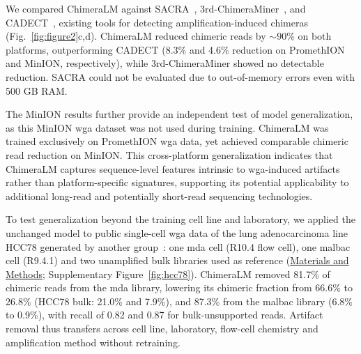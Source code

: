 \documentclass[pdflatex,lineno]{sn-jnl}%
\newif\ifrevisedtext
\newcommand{\chg}[1]{\ifrevisedtext\textcolor{revcolor}{#1}\else#1\fi}
\begin{document}
We compared ChimeraLM against SACRA~\cite{kiguchi2021longread}, 3rd-ChimeraMiner~\cite{lu2023exploration}, and CADECT~\cite{agyabeng2025evaluating}, existing tools for detecting amplification-induced chimeras (Fig.~\ref{fig:figure2}c,d).
ChimeraLM reduced chimeric reads by ${\sim}90$\% on both platforms, outperforming CADECT (8.3\% and 4.6\% reduction on PromethION and MinION, respectively), while 3rd-ChimeraMiner showed no detectable reduction.
SACRA could not be evaluated due to out-of-memory errors even with 500 GB RAM.

The MinION results further provide an independent test of model generalization, as this MinION \gls{wga} dataset was not used during training.
ChimeraLM was trained exclusively on PromethION \gls{wga} data, yet achieved comparable chimeric read reduction on MinION.
This cross-platform generalization indicates that ChimeraLM captures sequence-level features intrinsic to \gls{wga}-induced artifacts rather than platform-specific signatures, supporting its potential applicability to additional long-read and potentially short-read sequencing technologies.

\chg{To test generalization beyond the training cell line and laboratory, we applied the unchanged model to public single-cell \gls{wga} data of the lung adenocarcinoma line HCC78 generated by another group~\cite{ni2023benchmarking}: one \gls{mda} cell (R10.4 flow cell), one \gls{malbac} cell (R9.4.1) and two unamplified bulk libraries used as reference (\hyperref[sec:methods]{Materials and Methods}; Supplementary Figure~\ref{fig:hcc78}).
	ChimeraLM removed 81.7\% of chimeric reads from the \gls{mda} library, lowering its chimeric fraction from 66.6\% to 26.8\% (HCC78 bulk: 21.0\% and 7.9\%), and 87.3\% from the \gls{malbac} library (6.8\% to 0.9\%), with recall of 0.82 and 0.87 for bulk-unsupported reads.
	Artifact removal thus transfers across cell line, laboratory, flow-cell chemistry and amplification method without retraining.}
\end{document}
